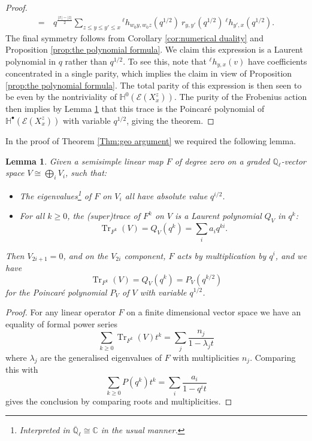 \documentclass[11pt]{article}
\DeclareMathOperator{\Tr}{\mathrm{Tr}}
\newtheorem{lem}[thm]{Lemma}
\theoremstyle{remark}
\theoremstyle{definition}
\begin{document}
\begin{proof}
\begin{align*}
        = &~ q^{\frac{|x|-|z|}{2}}\sum_{z \leq y \leq y' \leq x} {}^{\ell} h_{w_0y,w_0z}(q^{1/2})~r_{y,y'}(q^{1/2})~{}^{\ell} h_{y',x}(q^{1/2}).
    \end{align*}
    The final symmetry follows from Corollary \ref{cor:numerical duality} and Proposition \ref{prop:the polynomial formula}. We claim this expression is a Laurent polynomial in $q$ rather than $q^{1/2}$. To see this, note that ${}^{\ell} h_{y,x}(v)$ have coefficients concentrated in a single parity, which implies the claim in view of Proposition \ref{prop:the polynomial formula}. The total parity of this expression is then seen to be even by the nontriviality of $\mathbb{H}^0(\mathscr{E}(X^z_x))$.
    The purity of the Frobenius action then implies by Lemma \ref{lem:lin_alg} that this trace is the Poincar\'{e} polynomial of $\mathbb{H}^\bullet(\mathscr{E}(X^z_x))$ with variable $q^{1/2}$, giving the theorem.
   \end{proof}

In the proof of Theorem \ref{Thm:geo argument} we required the following lemma. 

\begin{lem}\label{lem:lin_alg}
Given a semisimple linear map $F$ of degree zero on a graded $\mathbb{Q}_\ell$-vector space $V\cong \bigoplus_i V_i$, such that:
\begin{itemize}
\item The eigenvalues\footnote{Interpreted in $\overline{\mathbb{Q}}_\ell \cong \mathbb{C}$ in the usual manner.} of $F$ on $V_i$ all have absolute value $q^{i/2}$.
\item For all $k\geq 0$, the (super)trace of $F^k$ on $V$ is a Laurent polynomial $Q_V$ in $q^k$:\[\Tr_{F^k}(V)=Q_V(q^k)=\sum_i a_i q^{ki}.\]
\end{itemize}
Then $V_{2i+1}=0$, and on the $V_{2i}$ component, $F$ acts by multiplication by $q^i$, and we have \[\Tr_{F^k}(V)=Q_V(q^k)=P_V(q^{k/2})\] for the Poincar\'{e} polynomial $P_V$ of $V$ with variable $q^{1/2}$.
\end{lem}
\begin{proof}
    For any linear operator $F$ on a finite dimensional vector space we have an equality of formal power series \[\sum_{k\geq 0} \Tr_{F^k}(V)t^k=\sum_{j}\frac{n_j}{1-\lambda_j t}\] where $\lambda_j$ are the generalised eigenvalues of $F$ with multiplicities $n_j$. Comparing this with \[\sum_{k\geq 0}P(q^k)t^k = \sum_i \frac{a_i}{1-q^i t}\] gives the conclusion by comparing roots and multiplicities.
\end{proof}
\end{document}

